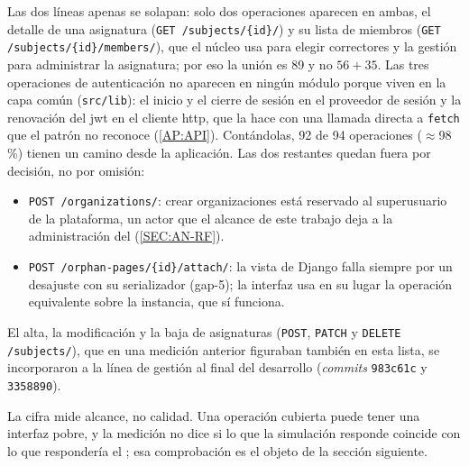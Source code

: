 Las dos líneas apenas se solapan: solo dos operaciones aparecen en ambas, el detalle de una
asignatura (\texttt{GET /subjects/\{id\}/}) y su lista de miembros
(\texttt{GET /subjects/\{id\}/members/}), que el núcleo usa para elegir correctores y la
gestión para administrar la asignatura; por eso la unión es 89 y no $56 + 35$.
Las tres operaciones de autenticación no aparecen en ningún módulo porque viven en la capa
común (\texttt{src/lib}): el inicio y el cierre de sesión en el proveedor de sesión y la
renovación del \acs{jwt} en el cliente \acs{http}, que la hace con una llamada directa a
\texttt{fetch} que el patrón no reconoce (\cref{AP:API}). Contándolas, 92 de 94
operaciones ($\approx$98\,\%) tienen un camino desde la aplicación. Las dos restantes
quedan fuera por decisión, no por omisión:
\begin{itemize}
  \item \texttt{POST /organizations/}: crear organizaciones está reservado al
        superusuario de la plataforma, un actor que el alcance de este trabajo deja a la
        administración del  (\cref{SEC:AN-RF}).
  \item \texttt{POST /orphan-pages/\{id\}/attach/}: la vista de Django falla siempre por un
        desajuste con su serializador (gap-5); la interfaz usa en su lugar la operación
        equivalente sobre la instancia, que sí funciona.
\end{itemize}
El alta, la modificación y la baja de asignaturas (\texttt{POST}, \texttt{PATCH} y
\texttt{DELETE /subjects/}), que en una medición anterior figuraban también en esta lista,
se incorporaron a la línea de gestión al final del desarrollo (\textit{commits}
\texttt{983c61c} y \texttt{3358890}).

La cifra mide alcance, no calidad. Una operación cubierta puede tener una interfaz pobre,
y la medición no dice si lo que la simulación responde coincide con lo que respondería el
; esa comprobación es el objeto de la sección siguiente.
